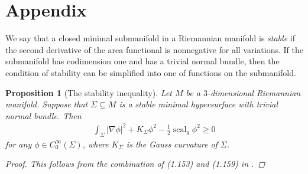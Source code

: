 \documentclass[12pt]{amsart}
\makeatletter
\newtheorem*{rep@theorem}{{Lemma} \ref##}
\newtheorem{prop}[dfn]{Proposition}
	{\newenvironment{rep{prop}}[1]{ } \begin{rep@theorem}} \end{rep@theorem}}
\numberwithin{equation}{section}
\makeatother
\begin{document}
{}


\section{Appendix}

We say that a closed minimal submanifold in a Riemannian manifold is
\emph{stable} if the second derivative of the area functional is nonnegative for
all variations. If the submanifold has codimension one and has a trivial
normal bundle, then the condition of stability can be simplified
into one of functions on the submanifold. 
 \begin{prop}[{The stability inequality}]Let $M$ be a $3$-dimensional
  Riemannian manifold. Suppose that $\Sigma\subseteq M$ is a stable minimal
  hypersurface with trivial normal bundle. Then
  \begin{align*}
   \int_{\Sigma}  | \nabla \phi |^2 + K_{\Sigma} \phi^2 -\frac{1}{2}{\mathop{\mathrm{scal}} \nolimits}_g \phi^2 \geq 0 
  \end{align*}for any $\phi \in C^{\infty}_0(\Sigma)$, where
  $K_{\Sigma}$ is the Gauss curvature of $\Sigma$.
  \begin{proof}This follows from the combination of (1.153) and (1.159) in \cite{Colding11}.
   \end{proof}
  \end{prop}
\end{document}
